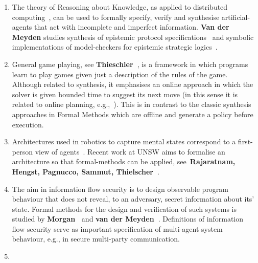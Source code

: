 \documentclass[a4paper,12pt,smallheadings]{scrartcl}
\begin{document}
\begin{enumerate}
\item The theory of Reasoning about Knowledge, as applied to distributed computing~\cite{FHMV95}, can be used to formally specify, verify and synthesise artificial-agents 
that act with incomplete and imperfect information. \textbf{Van der Meyden} studies synthesis of epistemic protocol specifications~\cite{DBLP:conf/concur/MeydenV98,DBLP:journals/corr/HuangM16} and symbolic implementations of model-checkers for epistemic strategic logics~\cite{DBLP:conf/aaai/HuangM14}.

 \item General game playing, see \textbf{Thieschler~\cite{GGP}}, is a framework in which programs learn to play games given just a description of the rules of the game. Although related to synthesis, it emphasises an online approach in which the solver is given bounded time to suggest its next move (in this sense it is related to online planning, e.g.,~\cite{GeffnerBo13}). This is in contrast to the classic synthesis approaches in Formal Methods which are offline and generate a policy before execution. 
 
 \item Architectures used in robotics to capture mental states  correspond to a first-person view of agents~\cite{reiter2001knowledge}. Recent work at UNSW aims to formalise an architecture so that formal-methods can be applied, see~\textbf{Rajaratnam, Hengst, Pagnucco, Sammut, Thielscher~\cite{Rajaratnam2016}}.
 
 \item The aim in information flow security is to design observable program behaviour that does not reveal, to an adversary, secret information about its' state. Formal methods for the design and verification of such systems is studied by \textbf{Morgan~\cite{McIver2011}} and \textbf{van der Meyden~\cite{DBLP:conf/sp/EggertMSW11,DBLP:journals/tcs/CassezMZ16}}.  
 Definitions of information flow security serve as important specification of multi-agent system behaviour, e.g., in secure multi-party communication. 

 \item {}
 
 \end{enumerate}
 
 
 \newpage
 
\end{document}
